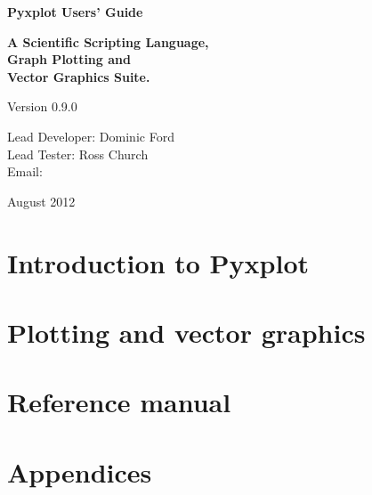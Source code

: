 \documentclass[a4paper,onecolumn,11pt]{book}
\def\version{0.9.0}
\def\reldate{August 2012}
\begin{document}
\begin{titlepage}
\normalsize
\begin{center}
{\Huge \bf Pyxplot Users' Guide}\\
\end{center}
\newline
\begin{center}
{\LARGE \bf A Scientific Scripting Language, \\ Graph Plotting and \\ Vector Graphics Suite. \\}
\end{center}
\newline
\begin{center}
{\Large Version \version \\}
\end{center}
\newline
\begin{center}
{\large
Lead Developer: Dominic Ford \\
\vspace{1mm}
Lead Tester: Ross Church \\
\vspace{2mm}
Email:  \\
}
\end{center}
\newline
\begin{center}
{\Large \reldate \\}
\end{center}
\end{titlepage}

\part{Introduction to Pyxplot}







\part{Plotting and vector graphics}
\setcounter{chapter}{7}



\part{Reference manual}
\setcounter{chapter}{10}









\part{Appendices}
\appendix





\printindex
\end{document}
